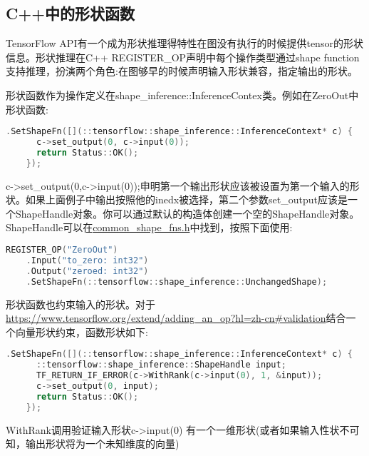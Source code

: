 \subsection{C++中的形状函数}
TensorFlow API有一个成为形状推理得特性在图没有执行的时候提供tensor的形状信息。形状推理在C++ REGISTER\_OP声明中每个操作类型通过shape function支持推理，扮演两个角色:在图够早的时候声明输入形状兼容，指定输出的形状。

形状函数作为操作定义在shape\_inference::InferenceContex类。例如在ZeroOut中形状函数:
\begin{lstlisting}[language=C++]
.SetShapeFn([](::tensorflow::shape_inference::InferenceContext* c) {
      c->set_output(0, c->input(0));
      return Status::OK();
    });

\end{lstlisting}
c->set_output(0,c->input(0));申明第一个输出形状应该被设置为第一个输入的形状。如果上面例子中输出按照他的inedx被选择，第二个参数set\_output应该是一个ShapeHandle对象。你可以通过默认的构造体创建一个空的ShapeHandle对象。ShapeHandle可以在\href{https://www.github.com/tensorflow/tensorflow/blob/r1.4/tensorflow/core/framework/common_shape_fns.h}{common\_shape\_fns.h}中找到，按照下面使用:
\begin{lstlisting}[language=C++]
REGISTER_OP("ZeroOut")
    .Input("to_zero: int32")
    .Output("zeroed: int32")
    .SetShapeFn(::tensorflow::shape_inference::UnchangedShape);

\end{lstlisting}
形状函数也约束输入的形状。对于\href{ZeroOut}{https://www.tensorflow.org/extend/adding_an_op?hl=zh-cn#validation}{结合一个向量形状约束}，函数形状如下:
\begin{lstlisting}[language=C++]
 .SetShapeFn([](::tensorflow::shape_inference::InferenceContext* c) {
      ::tensorflow::shape_inference::ShapeHandle input;
      TF_RETURN_IF_ERROR(c->WithRank(c->input(0), 1, &input));
      c->set_output(0, input);
      return Status::OK();
    });
\end{lstlisting}
WithRank调用验证输入形状c->input(0) 有一个一维形状(或者如果输入性状不可知，输出形状将为一个未知维度的向量)

